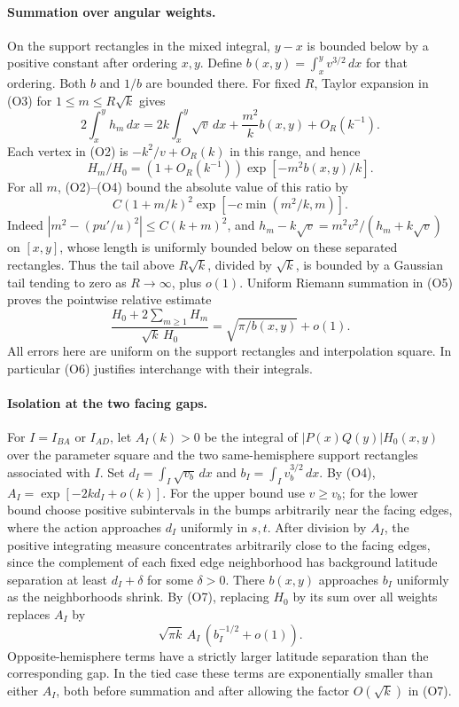 \documentclass[11pt,letterpaper]{article}
\begin{document}
\paragraph{Summation over angular weights.}
On the support rectangles in the mixed integral, \(y-x\) is bounded
below by a positive constant after ordering \(x,y\). Define
\(b(x,y)=\int_x^y v^{3/2}\,dx\) for that ordering. Both \(b\) and
\(1/b\) are bounded there. For fixed \(R\), Taylor expansion in (O3)
for \(1\leq m\leq R\sqrt k\) gives
\[
 2\int_x^y h_m\,dx=2k\int_x^y\sqrt v\,dx+
     \frac{m^2}{k}b(x,y)+O_R(k^{-1}).
\]
Each vertex in (O2) is \(-k^2/v+O_R(k)\) in this range, and hence
\[
 H_m/H_0=(1+O_R(k^{-1}))\exp[-m^2 b(x,y)/k].
 \tag{O5}
\]
For all \(m\), (O2)--(O4) bound the absolute value of this ratio by
\[
 C(1+m/k)^2\exp[-c\min(m^2/k,m)].
 \tag{O6}
\]
Indeed \(|m^2-(pu'/u)^2|\leq C(k+m)^2\), and
\(h_m-k\sqrt v=m^2v^2/(h_m+k\sqrt v)\) on \([x,y]\), whose
length is uniformly bounded below on these separated rectangles.
Thus the tail above \(R\sqrt k\), divided by \(\sqrt k\), is bounded
by a Gaussian tail tending to zero as \(R\to\infty\), plus \(o(1)\).
Uniform Riemann summation in (O5) proves the pointwise relative estimate
\[
 \frac{H_0+2\sum_{m\geq1}H_m}{\sqrt k\,H_0}
      =\sqrt{\pi/b(x,y)}+o(1).
 \tag{O7}
\]
All errors here are uniform on the support rectangles and interpolation
square. In particular (O6) justifies interchange with their integrals.

\paragraph{Isolation at the two facing gaps.}
For \(I=I_{BA}\) or \(I_{AD}\), let \(A_I(k)>0\) be the integral of
\(|P(x)Q(y)|H_0(x,y)\) over the parameter square and the two
same-hemisphere support rectangles associated with \(I\). Set
\(d_I=\int_I\sqrt{v_b}\,dx\) and \(b_I=\int_I v_b^{3/2}\,dx\).
By (O4), \(A_I=\exp[-2k d_I+o(k)]\). For the upper bound use
\(v\geq v_b\); for the lower bound choose positive subintervals in
the bumps arbitrarily near the facing edges, where the action approaches
\(d_I\) uniformly in \(s,t\). After division by \(A_I\), the positive
integrating measure concentrates arbitrarily close to the facing edges,
since the complement of each fixed edge neighborhood has background
latitude separation at least \(d_I+\delta\) for some \(\delta>0\).
There \(b(x,y)\) approaches \(b_I\) uniformly as the neighborhoods shrink.
By (O7), replacing \(H_0\) by its sum over all weights replaces
\(A_I\) by
\[
 \sqrt{\pi k}\,A_I\,(b_I^{-1/2}+o(1)).
 \tag{O8}
\]
Opposite-hemisphere terms have a strictly larger latitude separation
than the corresponding gap. In the tied case these terms are exponentially
smaller than either \(A_I\), both before summation and after allowing the
factor \(O(\sqrt k)\) in (O7).
\end{document}
